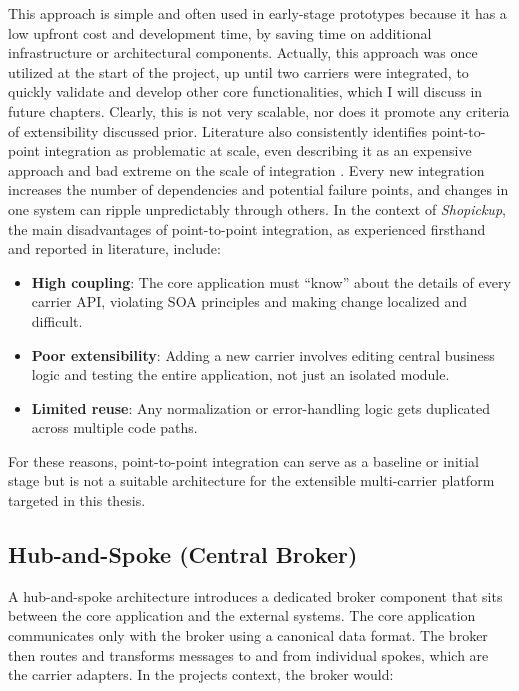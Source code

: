 \documentclass{imc-inf}
\begin{document}
This approach is simple and often used in early-stage prototypes because it has a low upfront cost and development time, by saving time on additional infrastructure or architectural components.
Actually, this approach was once utilized at the start of the project, up until two carriers were integrated, to quickly validate and develop other core functionalities, which I will discuss in future chapters.
Clearly, this is not very scalable, nor does it promote any criteria of extensibility discussed prior.
Literature also consistently identifies point-to-point integration as problematic at scale, even describing it as an expensive approach and bad extreme on the scale of integration \cite{gulledgeWhatIntegration2006}.
Every new integration increases the number of dependencies and potential failure points, and changes in one system can ripple unpredictably through others.
In the context of \textit{Shopickup}, the main disadvantages of point-to-point integration, as experienced firsthand and reported in literature, include:

\begin{itemize}[itemsep=3pt]
  \item \textbf{High coupling}: The core application must “know” about the details of every carrier API, violating SOA principles and making change localized and difficult.
  \item \textbf{Poor extensibility}: Adding a new carrier involves editing central business logic and testing the entire application, not just an isolated module.
  \item \textbf{Limited reuse}: Any normalization or error-handling logic gets duplicated across multiple code paths.
\end{itemize}

For these reasons, point-to-point integration can serve as a baseline or initial stage but is not a suitable architecture for the extensible multi-carrier platform targeted in this thesis.

\subsection{Hub-and-Spoke (Central Broker)}

A hub-and-spoke architecture introduces a dedicated broker component that sits between the core application and the external systems.
The core application communicates only with the broker using a canonical data format. The broker then routes and transforms messages to and from individual spokes, which are the carrier adapters.
In the projects context, the broker would:
\end{document}
